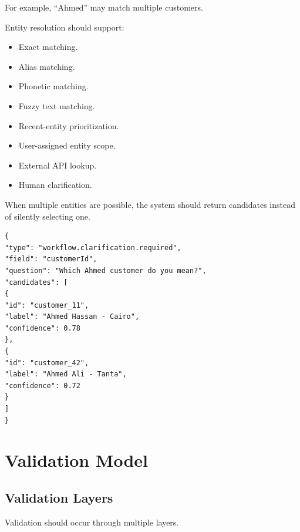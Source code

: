 \documentclass[11pt,a4paper]{article}
\begin{document}
For example, ``Ahmed'' may match multiple customers.

Entity resolution should support:

\begin{itemize}
\item Exact matching.
\item Alias matching.
\item Phonetic matching.
\item Fuzzy text matching.
\item Recent-entity prioritization.
\item User-assigned entity scope.
\item External API lookup.
\item Human clarification.
\end{itemize}

When multiple entities are possible, the system should return candidates
instead of silently selecting one.

\begin{lstlisting}[language={},caption={Entity ambiguity event}]
{
"type": "workflow.clarification.required",
"field": "customerId",
"question": "Which Ahmed customer do you mean?",
"candidates": [
{
"id": "customer_11",
"label": "Ahmed Hassan - Cairo",
"confidence": 0.78
},
{
"id": "customer_42",
"label": "Ahmed Ali - Tanta",
"confidence": 0.72
}
]
}
\end{lstlisting}

\section{Validation Model}

\subsection{Validation Layers}

Validation should occur through multiple layers.
\end{document}
